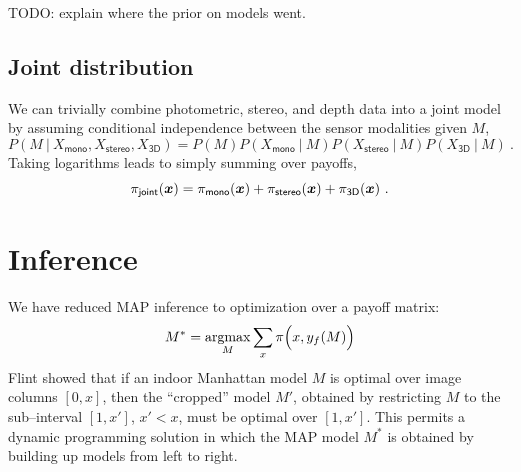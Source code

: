 \documentclass{article}
\newcommand\ColPayoff{\pi}
\newcommand\Model{M}
\begin{document}
TODO: explain where the prior on models went.

\subsection{Joint distribution}

We can trivially combine photometric, stereo, and depth data into a
joint model by assuming conditional independence between the sensor
modalities given $M$,
\begin{equation}
  P(M ~|~ X_{\textsf{mono}}, X_{\textsf{stereo}}, X_{\textsf{3D}})
  =  P(M) P(X_{\textsf{mono}} ~|~ M)
          P(X_{\textsf{stereo}} ~|~ M)
          P(X_{\textsf{3D}} ~|~ M) ~.
\end{equation}
Taking logarithms leads to simply summing over payoffs,
\begin{equation}
  \ColPayoff_{\textsf{joint}}(\vect{x}) =
  \ColPayoff_{\textsf{mono}}(\vect{x}) + 
  \ColPayoff_{\textsf{stereo}}(\vect{x}) +
  \ColPayoff_{\textsf{3D}}(\vect{x}) ~.
\end{equation}

\section{Inference}

\newcommand\OptModel{\Model^*}
\newcommand\PartialModel{\Model}
\newcommand\CroppedModel{\Model'}
\newcommand\PartialCol{x}
\newcommand\CroppedCol{x'}

We have reduced MAP inference to optimization over a payoff matrix:
\begin{equation}
  \OptModel = \argmax_\Model\limits \sum_x \ColPayoff\Bigl(x,y_f(\Model)\Bigr)
\end{equation}
Flint \etal \cite{FlintECCV10} showed that if an indoor Manhattan
model $\PartialModel$ is optimal over image columns
$\left[0,\PartialCol\right]$, then the ``cropped'' model
$\CroppedModel$, obtained by restricting $\PartialModel$ to the
sub--interval $\left[1,\CroppedCol\right]$, $\CroppedCol<\PartialCol$,
must be optimal over $\left[1,\CroppedCol\right]$. This permits a
dynamic programming solution in which the MAP model $\OptModel$ is
obtained by building up models from left to right.
\end{document}
